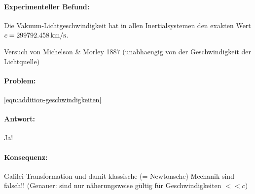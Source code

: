 \documentclass{scrartcl}
\begin{document}
\paragraph{Experimenteller Befund:}
Die Vakuum-Lichtgeschwindigkeit hat in allen Inertialsystemen den
exakten Wert $c=\unit[299792.458]{\textrm{km}/\textrm{s}}$.

Versuch von Michelson \& Morley 1887 (unabhaengig von der
Geschwindigkeit der Lichtquelle)

\paragraph{Problem:}
\ref{eqn:addition-geschwindigkeiten}


\paragraph{Antwort:} Ja!

\paragraph{Konsequenz:} Galilei-Transformation und damit klassische (=
Newtonsche) Mechanik sind falsch!!  (Genauer: sind nur
n\"aherungsweise g\"ultig f\"ur Geschwindigkeiten $<< c$)
\end{document}
